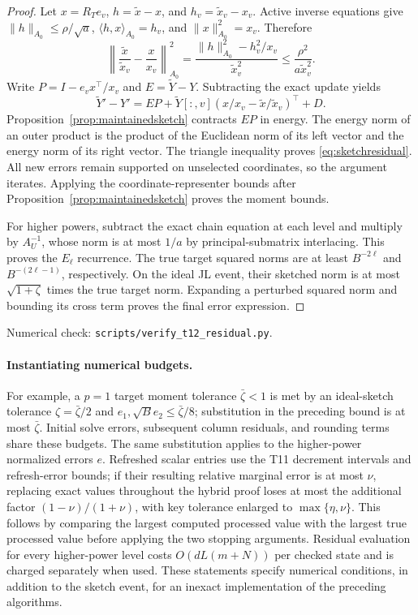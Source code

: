 \documentclass[11pt]{article}
\begin{document}
\begin{proof}
Let $x=R_Te_v$, $h=\widetilde x-x$, and $h_v=\widetilde x_v-x_v$.
Active inverse equations give
$\|h\|_{A_0}\leq\rho/\sqrt a$,
$\langle h,x\rangle_{A_0}=h_v$, and
$\|x\|_{A_0}^2=x_v$. Therefore
\[
 \left\|\frac{\widetilde x}{\widetilde x_v}
              -\frac{x}{x_v}\right\|_{A_0}^2
 =\frac{\|h\|_{A_0}^2-h_v^2/x_v}{\widetilde x_v^2}
 \leq\frac{\rho^2}{a\widetilde x_v^2}.
\]
Write $P=I-e_vx^\top/x_v$ and $E=\widetilde Y-Y$.
Subtracting the exact update yields
\[
 \widetilde Y'-Y'=EP+
 \widetilde Y[:,v]\left(x/x_v-\widetilde x/\widetilde x_v\right)^\top+D.
\]
Proposition~\ref{prop:maintainedsketch} contracts $EP$ in energy.
The energy norm of an outer product is the product of the
Euclidean norm of its left vector and the energy norm of its
right vector. The triangle inequality proves
\eqref{eq:sketchresidual}. All new errors remain supported on
unselected coordinates, so the argument iterates. Applying the
coordinate-representer bounds after
Proposition~\ref{prop:maintainedsketch} proves the moment bounds.

For higher powers, subtract the exact chain equation at each
level and multiply by $A_U^{-1}$, whose norm is at most $1/a$
by principal-submatrix interlacing. This proves the $E_\ell$
recurrence. The true target squared norms are at least
$B^{-2\ell}$ and $B^{-(2\ell-1)}$, respectively. On the ideal
JL event, their sketched norm is at most $\sqrt{1+\zeta}$
times the true target norm. Expanding a perturbed squared norm
and bounding its cross term proves the final error expression.
\end{proof}
\noindent Numerical check:
\texttt{scripts/verify\_t12\_residual.py}.

\paragraph{Instantiating numerical budgets.}
For example, a $p=1$ target moment tolerance $\bar\zeta<1$
is met by an ideal-sketch tolerance $\zeta=\bar\zeta/2$ and
$e_1,\sqrt B e_2\leq\bar\zeta/8$; substitution in the preceding
bound is at most $\bar\zeta$. Initial solve errors, subsequent
column residuals, and rounding terms share these budgets.
The same substitution applies to the higher-power normalized
errors $e$. Refreshed scalar entries use the T11 decrement
intervals and refresh-error bounds; if their resulting relative
marginal error is at most $\nu$, replacing exact values throughout
the hybrid proof loses at most the additional factor
$(1-\nu)/(1+\nu)$, with key tolerance enlarged to
$\max\{\eta,\nu\}$. This follows by comparing the largest
computed processed value with the largest true processed value
before applying the two stopping arguments. Residual evaluation
for every higher-power level costs $O(dL(m+N))$ per checked
state and is charged separately when used. These statements
specify numerical conditions, in addition to the sketch event,
for an inexact implementation of the preceding algorithms.
\end{document}
